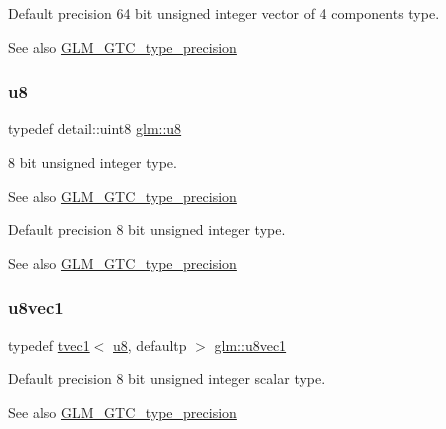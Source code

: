 Default precision 64 bit unsigned integer vector of 4 components type. \begin{DoxySeeAlso}{See also}
\hyperlink{group__gtc__type__precision}{G\+L\+M\+\_\+\+G\+T\+C\+\_\+type\+\_\+precision} 
\end{DoxySeeAlso}
\mbox{\label{group__gtc__type__precision_ga5e3dc67373d5068997d2d9f41c9024d2}} 
\subsubsection{\texorpdfstring{u8}{u8}}
{\footnotesize\ttfamily typedef detail\+::uint8 \hyperlink{group__gtc__type__precision_ga5e3dc67373d5068997d2d9f41c9024d2}{glm\+::u8}}

8 bit unsigned integer type. \begin{DoxySeeAlso}{See also}
\hyperlink{group__gtc__type__precision}{G\+L\+M\+\_\+\+G\+T\+C\+\_\+type\+\_\+precision}
\end{DoxySeeAlso}
Default precision 8 bit unsigned integer type. \begin{DoxySeeAlso}{See also}
\hyperlink{group__gtc__type__precision}{G\+L\+M\+\_\+\+G\+T\+C\+\_\+type\+\_\+precision} 
\end{DoxySeeAlso}
\mbox{\label{group__gtc__type__precision_ga024be724ff45865952190522b03fc0d5}} 
\subsubsection{\texorpdfstring{u8vec1}{u8vec1}}
{\footnotesize\ttfamily typedef \hyperlink{structglm_1_1tvec1}{tvec1}$<$ \hyperlink{group__gtc__type__precision_ga5e3dc67373d5068997d2d9f41c9024d2}{u8}, defaultp $>$ \hyperlink{group__gtc__type__precision_ga024be724ff45865952190522b03fc0d5}{glm\+::u8vec1}}

Default precision 8 bit unsigned integer scalar type. \begin{DoxySeeAlso}{See also}
\hyperlink{group__gtc__type__precision}{G\+L\+M\+\_\+\+G\+T\+C\+\_\+type\+\_\+precision} 
\end{DoxySeeAlso}
\mbox{\label{group__gtc__type__precision_ga1c259b876f8757eb197b83a5fab476f0}} 
